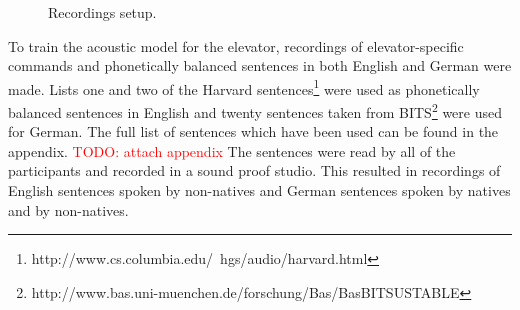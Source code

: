 \documentclass[a4paper, 12pt]{article}
\newcommand\todo[1]{\textcolor{red}{#1}}
\begin{document}
\begin{figure}
\caption{Recordings setup.}
\label{fig:recordingsetup}
\end{figure}


To train the acoustic model for the elevator, recordings of elevator-specific commands and phonetically balanced sentences in both English and German were made. 
Lists one and two  of the Harvard sentences\footnote{http://www.cs.columbia.edu/~hgs/audio/harvard.html} were used as phonetically balanced sentences in English and twenty sentences taken from BITS\footnote{http://www.bas.uni-muenchen.de/forschung/Bas/BasBITSUSTABLE} were used for German. 
The full list of sentences which have been used can be found in the appendix. \todo{TODO: attach appendix} %
The sentences were read by all of the participants and recorded in a sound proof studio. 
This resulted in recordings of English sentences spoken by non-natives and German sentences spoken by natives and by non-natives.
\end{document}
